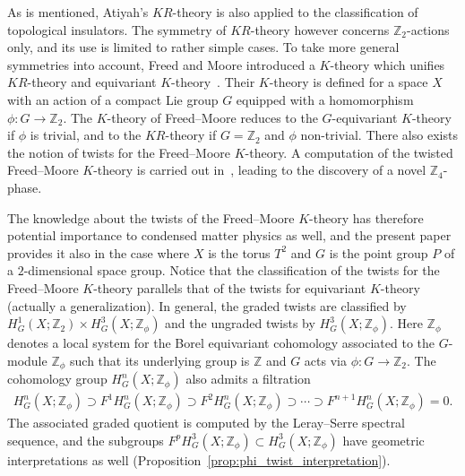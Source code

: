 \documentclass[pdftex]{sigma}
\theoremstyle{definition}
\newcommand{\Z}{\mathbb{Z}}
\begin{document}
As is mentioned, Atiyah's $KR$-theory is also applied to the classif\/ication of topological insulators. The symmetry of $KR$-theory however concerns $\Z_2$-actions only, and its use is limited to rather simple cases. To take more general symmetries into account, Freed and Moore introduced a $K$-theory which unif\/ies $KR$-theory and equivariant $K$-theory~\cite{F-M}. Their $K$-theory is def\/ined for a space $X$ with an action of a compact Lie group $G$ equipped with a homomorphism $\phi\colon G \to \Z_2$. The $K$-theory of Freed--Moore reduces to the $G$-equivariant $K$-theory if $\phi$ is trivial, and to the $KR$-theory if $G = \Z_2$ and $\phi$ non-trivial. There also exists the notion of twists for the Freed--Moore $K$-theory. A computation of the twisted Freed--Moore $K$-theory is carried out in~\cite{SSG2}, leading to the discovery of a novel $\Z_4$-phase.

The knowledge about the twists of the Freed--Moore $K$-theory has therefore potential importance to condensed matter physics as well, and the present paper provides it also in the case where $X$ is the torus $T^2$ and $G$ is the point group $P$ of a $2$-dimensional space group. Notice that the classif\/ication of the twists for the Freed--Moore $K$-theory parallels that of the twists for equivariant $K$-theory (actually a generalization). In general, the graded twists are classif\/ied by $H^1_G(X; \Z_2) \times H^3_G(X; \Z_\phi)$ and the ungraded twists by $H^3_G(X; \Z_\phi)$. Here $\Z_\phi$ denotes a local system for the Borel equivariant cohomology associated to the $G$-module $\Z_\phi$ such that its underlying group is $\Z$ and $G$ acts via $\phi\colon G \to \Z_2$. The cohomology group $H^n_G(X; \Z_\phi)$ also admits a f\/iltration
\begin{gather*}
H^n_G(X; \Z_\phi) \supset F^1H^n_G(X; \Z_\phi) \supset F^2H^n_G(X; \Z_\phi) \supset \cdots \supset F^{n+1}H^n_G(X; \Z_\phi) = 0.
\end{gather*}
The associated graded quotient is computed by the Leray--Serre spectral sequence, and the subgroups $F^pH^3_G(X; \Z_\phi) \subset H^3_G(X; \Z_\phi)$ have geometric interpretations as well (Proposition~\ref{prop:phi_twist_interpretation}).
\end{document}
